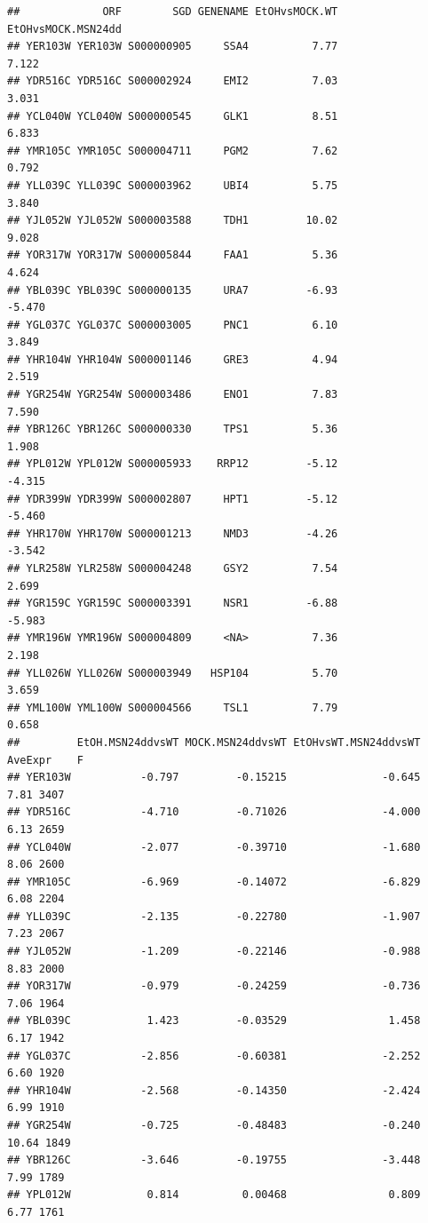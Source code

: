 \documentclass[
]{book}
\begin{document}
\begin{verbatim}
##             ORF        SGD GENENAME EtOHvsMOCK.WT EtOHvsMOCK.MSN24dd
## YER103W YER103W S000000905     SSA4          7.77              7.122
## YDR516C YDR516C S000002924     EMI2          7.03              3.031
## YCL040W YCL040W S000000545     GLK1          8.51              6.833
## YMR105C YMR105C S000004711     PGM2          7.62              0.792
## YLL039C YLL039C S000003962     UBI4          5.75              3.840
## YJL052W YJL052W S000003588     TDH1         10.02              9.028
## YOR317W YOR317W S000005844     FAA1          5.36              4.624
## YBL039C YBL039C S000000135     URA7         -6.93             -5.470
## YGL037C YGL037C S000003005     PNC1          6.10              3.849
## YHR104W YHR104W S000001146     GRE3          4.94              2.519
## YGR254W YGR254W S000003486     ENO1          7.83              7.590
## YBR126C YBR126C S000000330     TPS1          5.36              1.908
## YPL012W YPL012W S000005933    RRP12         -5.12             -4.315
## YDR399W YDR399W S000002807     HPT1         -5.12             -5.460
## YHR170W YHR170W S000001213     NMD3         -4.26             -3.542
## YLR258W YLR258W S000004248     GSY2          7.54              2.699
## YGR159C YGR159C S000003391     NSR1         -6.88             -5.983
## YMR196W YMR196W S000004809     <NA>          7.36              2.198
## YLL026W YLL026W S000003949   HSP104          5.70              3.659
## YML100W YML100W S000004566     TSL1          7.79              0.658
##         EtOH.MSN24ddvsWT MOCK.MSN24ddvsWT EtOHvsWT.MSN24ddvsWT AveExpr    F
## YER103W           -0.797         -0.15215               -0.645    7.81 3407
## YDR516C           -4.710         -0.71026               -4.000    6.13 2659
## YCL040W           -2.077         -0.39710               -1.680    8.06 2600
## YMR105C           -6.969         -0.14072               -6.829    6.08 2204
## YLL039C           -2.135         -0.22780               -1.907    7.23 2067
## YJL052W           -1.209         -0.22146               -0.988    8.83 2000
## YOR317W           -0.979         -0.24259               -0.736    7.06 1964
## YBL039C            1.423         -0.03529                1.458    6.17 1942
## YGL037C           -2.856         -0.60381               -2.252    6.60 1920
## YHR104W           -2.568         -0.14350               -2.424    6.99 1910
## YGR254W           -0.725         -0.48483               -0.240   10.64 1849
## YBR126C           -3.646         -0.19755               -3.448    7.99 1789
## YPL012W            0.814          0.00468                0.809    6.77 1761

\end{verbatim}
\end{document}
